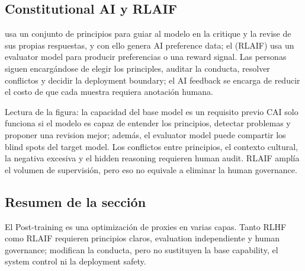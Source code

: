\subsection{Constitutional AI y RLAIF}

 usa un conjunto de principios para guiar al modelo en la critique y la revise de sus propias respuestas, y con ello genera AI preference data; el  (RLAIF) usa un evaluator model para producir preferencias o una reward signal. Las personas siguen encargándose de elegir los principles, auditar la conducta, resolver conflictos y decidir la deployment boundary; el AI feedback se encarga de reducir el costo de que cada muestra requiera anotación humana.


\begin{knowledgebox}{Lectura de la figura: la capacidad del base model es un requisito previo}
CAI solo funciona si el modelo es capaz de entender los principios, detectar problemas y proponer una revision mejor; además, el evaluator model puede compartir los blind spots del target model. Los conflictos entre principios, el contexto cultural, la negativa excesiva y el hidden reasoning requieren human audit. RLAIF amplía el volumen de supervisión, pero eso no equivale a eliminar la human governance.
\end{knowledgebox}


\subsection{Resumen de la sección}

El Post-training es una optimización de proxies en varias capas. Tanto RLHF como RLAIF requieren principios claros, evaluation independiente y human governance; modifican la conducta, pero no sustituyen la base capability, el system control ni la deployment safety.
